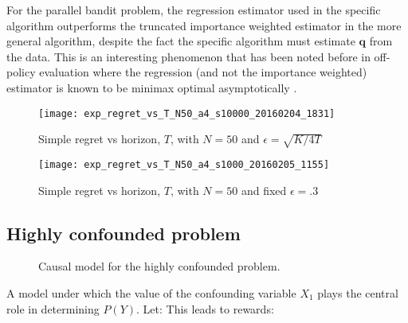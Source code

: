 For the parallel bandit problem, the regression estimator used in the specific algorithm outperforms the truncated importance weighted estimator in the more 
general algorithm, despite the fact the specific algorithm must estimate $\boldsymbol{q}$ from the data. 
This is an interesting phenomenon that has been noted before in off-policy evaluation where the regression (and not the importance weighted) estimator
is known to be minimax optimal asymptotically \citep{LMS14}.

\begin{figure}
\caption{Simple regret vs horizon, $T$, with $N = 50$ and $\epsilon = \sqrt{K/4T}$}
\label{fig:simple_vs_T_vary_epsilon}
\centering
\texttt{[image: exp\_regret\_vs\_T\_N50\_a4\_s10000\_20160204\_1831]}
\end{figure}

\begin{figure}
\caption{Simple regret vs horizon, $T$, with $N = 50$ and fixed $\epsilon = .3$}
\label{fig:simple_vs_T}
\centering
\texttt{[image: exp\_regret\_vs\_T\_N50\_a4\_s1000\_20160205\_1155]}
\end{figure}


\subsection{Highly confounded problem}

 
\begin{figure}[h]
\centering
\caption{Causal model for the highly confounded problem.}
\label{fig:causalStructure_highly_confounded}
\end{figure}


A model under which the value of the confounding variable $X_1$ plays the central role in determining $P(Y)$.  Let:
This leads to rewards:



